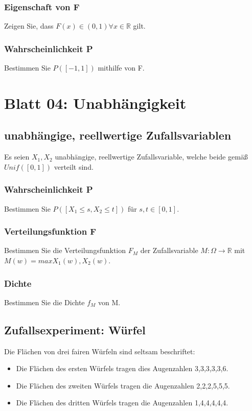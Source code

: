\documentclass[paper=a4, fontsize=11pt]{scrartcl}
\numberwithin{equation}{section}
\numberwithin{figure}{section}
\numberwithin{table}{section}
\begin{document}
\subsubsection{Eigenschaft von F}
Zeigen Sie, dass $F(x) \in (0,1) \forall x \in \mathbb{R}$ gilt. \\

\subsubsection{Wahrscheinlichkeit P}
Bestimmen Sie $P([-1,1])$ mithilfe von F. \\

\section{Blatt 04: Unabhängigkeit}
\subsection{unabhängige, reellwertige Zufallsvariablen}
Es seien $X_{1}, X_{2}$ unabhängige, reellwertige Zufallsvariable, welche beide gemäß $Unif([0,1])$ verteilt sind. \\

\subsubsection{Wahrscheinlichkeit P}
Bestimmen Sie $P([X_{1} \leq s, X_{2} \leq t])$ für $s,t \in [0,1]$. \\

\subsubsection{Verteilungsfunktion F}
Bestimmen Sie die Verteilungsfunktion $F_{M}$ der Zufallsvariable $M: \Omega \rightarrow \mathbb{R}$ mit $M(w)=max{X_{1}(w),X_{2}(w)}$. \\

\subsubsection{Dichte}
Bestimmen Sie die Dichte $f_{M}$ von M. \\

\subsection{Zufallsexperiment: Würfel}
Die Flächen von drei fairen Würfeln sind seltsam beschriftet:
\begin{itemize}
\item Die Flächen des ersten Würfels tragen dies Augenzahlen 3,3,3,3,3,6.
\item Die Flächen des zweiten Würfels tragen die Augenzahlen 2,2,2,5,5,5.
\item Die Flächen des dritten Würfels tragen die Augenzahlen 1,4,4,4,4,4.
\end{itemize}
\end{document}
